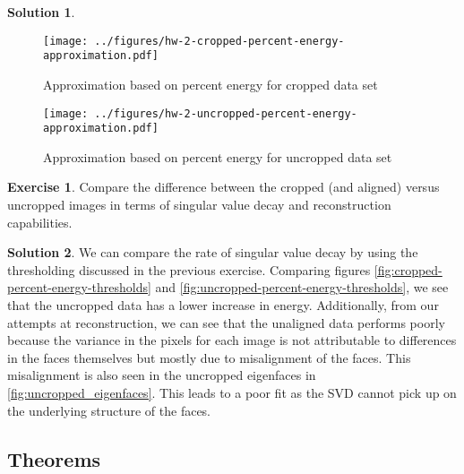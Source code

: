 \documentclass[12pt]{article}
\theoremstyle{definition}
\newtheorem{exer}{Exercise}
\newtheorem{sol}{Solution}
\theoremstyle{remark}
\begin{document}
\begin{sol}
    \begin{figure}[]
        \centering
        \texttt{[image: ../figures/hw-2-cropped-percent-energy-approximation.pdf]}
        \caption{Approximation based on percent energy for cropped data set}%
        \label{fig:cropped-percent-energy-approximation}
    \end{figure}
    \begin{figure}[]
        \centering
        \texttt{[image: ../figures/hw-2-uncropped-percent-energy-approximation.pdf]}
        \caption{Approximation based on percent energy for uncropped data set}%
        \label{fig:uncropped-percent-energy-approximation}
    \end{figure}
\end{sol}


\begin{exer}
Compare the difference between the cropped (and aligned) versus uncropped images in terms of singular
value decay and reconstruction capabilities.
\end{exer}

\begin{sol}
    We can compare the rate of singular value decay by using the thresholding discussed in the previous exercise. Comparing figures \cref{fig:cropped-percent-energy-thresholds} and \cref{fig:uncropped-percent-energy-thresholds}, we see that the uncropped data has a lower increase in energy. Additionally, from our attempts at reconstruction, we can see that the unaligned data performs poorly because the variance in the pixels for each image is not attributable to differences in the faces themselves but mostly due to misalignment of the faces. This misalignment is also seen in the uncropped eigenfaces in \cref{fig:uncropped_eigenfaces}. This leads to a poor fit as the SVD cannot pick up on the underlying structure of the faces. 
\end{sol}
\newpage

\subsection*{Theorems}%
\label{sub:theorems}
\end{document}
